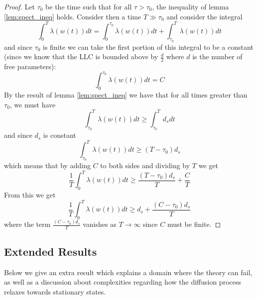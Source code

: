 \documentclass{article} %
\theoremstyle{definition}
\begin{document}
\begin{proof}
Let $\tau_0$ be the time such that for all $\tau > \tau_0$, the inequality of lemma \ref{lem:spect_ineq} holds. Consider then a time $T \gg \tau_0$ and consider the integral
\begin{equation}
\int_0^T \lambda(w(t)) dt = \int_0^{\tau_0} \lambda(w(t)) dt + \int_{\tau_0}^T \lambda(w(t)) dt
\end{equation}
and since $\tau_0$ is finite we can take the first portion of this integral to be a constant (since we know that the LLC is bounded above by $\frac{d}{2}$ where $d$ is the number of free parameters):
\begin{equation}
    \int_0^{\tau_0} \lambda(w(t)) dt = C
\end{equation}
By the result of lemma \ref{lem:spect_ineq} we have that for all times greater than $\tau_0$, we must have
\begin{equation}
    \int_{\tau_0}^T \lambda(w(t)) dt \geq \int_{\tau_0}^T d_s dt
\end{equation}
and since $d_s$ is constant
\begin{equation}
    \int_{\tau_0}^T \lambda(w(t)) dt \geq (T-\tau_0)d_s
\end{equation}
which means that by adding $C$ to both sides and dividing by $T$ we get
\begin{equation}
    \frac{1}{T}\int_0^T \lambda(w(t)) dt \geq \frac{(T-\tau_0)d_s}{T} + \frac{C}{T}
\end{equation}
From this we get
\begin{equation}
    \frac{1}{T}\int_0^T \lambda(w(t)) dt \geq d_s + \frac{(C-\tau_0)d_s}{T}
\end{equation}
where the term $\frac{(C-\tau_0)d_s}{T}$ vanishes as $T \to \infty$ since $C$ must be finite.
\end{proof}

\subsection{Extended Results}
Below we give an extra result which explains a domain where the theory can fail, as well as a discussion about complexities regarding how the diffusion process relaxes towards stationary states.
\end{document}
